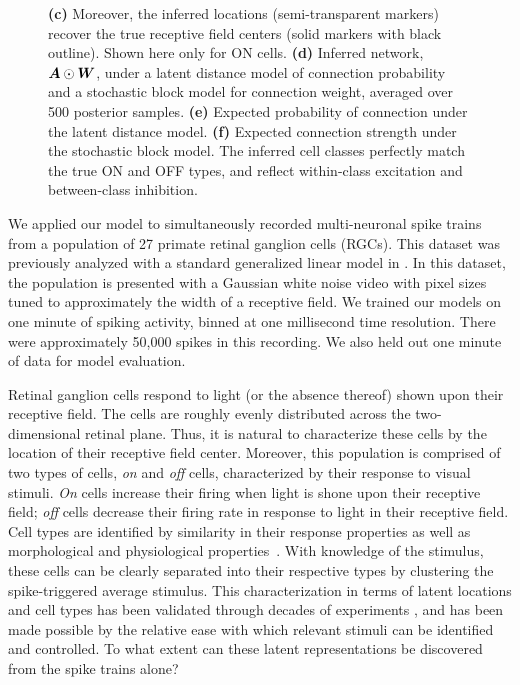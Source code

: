 \begin{figure}[t!]
{    \textbf{(c)} Moreover, the inferred locations (semi-transparent markers) recover the true receptive field centers (solid markers with black outline). Shown here only for ON cells.
    \textbf{(d)} Inferred network,~${\boldsymbol{A} \odot \boldsymbol{W}}$, under a latent distance model of connection probability and a stochastic block model for connection weight, averaged over 500 posterior samples.
    \textbf{(e)} Expected probability of connection under the latent distance model.
    \textbf{(f)} Expected connection strength under the stochastic block model. The inferred cell classes perfectly match the true ON and OFF types, and reflect within-class excitation and between-class inhibition.
}
  \label{fig:rgc}
\end{figure}

We applied our model to simultaneously recorded multi-neuronal spike
trains from a population of 27 primate retinal ganglion cells
(RGCs). This dataset was previously analyzed with a standard
generalized linear model in \citet{Pillow-2008}.  In this dataset, the
population is presented with a Gaussian white noise video with pixel
sizes tuned to approximately the width of a receptive field. We
trained our models on one minute of spiking activity, binned at one
millisecond time resolution. There were approximately 50,000 spikes in
this recording.  We also held out one minute of data for model
evaluation.

Retinal ganglion cells respond to light (or the absence thereof) shown
upon their receptive field. The cells are roughly evenly distributed
across the two-dimensional retinal plane. Thus, it is natural to
characterize these cells by the location of their receptive field
center.  Moreover, this population is comprised of two types of cells,
\textit{on} and \textit{off} cells, characterized by their response to
visual stimuli. \textit{On} cells increase their firing when light is
shone upon their receptive field; \textit{off} cells decrease their
firing rate in response to light in their receptive field.  Cell types
are identified by similarity in their response properties as well as
morphological and physiological
properties~\citep{sanes2015types}. With knowledge of the stimulus,
these cells can be clearly separated into their respective types by
clustering the spike-triggered average stimulus.  This
characterization in terms of latent locations and cell types has been
validated through decades of experiments \citep{kuffler1953discharge},
and has been made possible by the relative ease with which relevant
stimuli can be identified and controlled. To what extent can these
latent representations be discovered from the spike trains alone?

